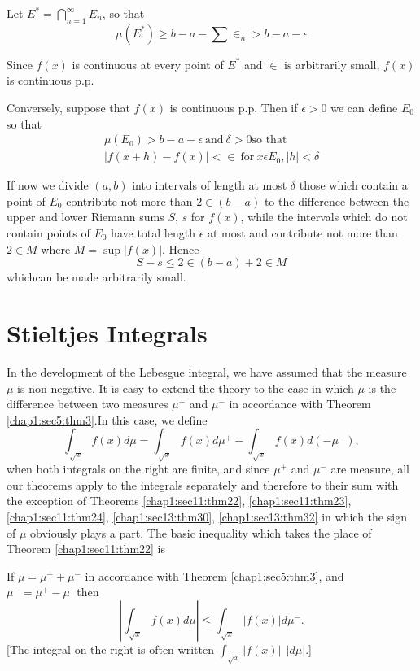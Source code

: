 Let $E^\ast=\bigcap\limits^\infty_{n=1} E_n$, so that
$$
\mu (E^\ast) \geq  b-a-\sum \in _n >  b-a-\epsilon 
$$

Since $f(x)$ is continuous at every point of $E^*$ and $\in $ is
arbitrarily small, $f(x)$ is continuous p.p. 

Conversely, suppose that $f(x)$ is continuous p.p. Then if $\epsilon >
0$ we can define $E_0$ so that 
\begin{gather*}
 \mu (E_0)> b-a-\epsilon ~\text{and}~ \delta >0 \text{so that} \\
 |f(x+h)-f(x)|< \in ~\text{for} ~ x \epsilon E_0, | h|< \delta
\end{gather*}

If now we divide $(a,b)$ into intervals of length at most $\delta$
those which contain a point of $E_0$ contribute not more than $2\in (b-a)$ to 
the difference between the upper and lower Riemann sums $S$, $s$ for
$f(x)$, while the intervals which do not contain points of $E_0$ have
total length $\epsilon$ at most and contribute not more than $2\in M$ where
$M=\sup |f(x)|$. Hence 
$$ 
S-s \leq  2 \in (b-a)+ 2 \in M 
$$
which\pageoriginale can be made arbitrarily small.
 
\section{Stieltjes Integrals}\label{chap1:sec15}

In the development of the Lebesgue integral, we have assumed
that the measure $\mu$ is non-negative. It is easy to extend the theory 
to the case in which $\mu$ is the difference between two measures
$\mu ^+$ and $\mu^-$ in accordance with Theorem
\ref{chap1:sec5:thm3}.In this case, we define 
$$ 
\int_{\sqrt{x}} f(x) d \mu = \int_{\sqrt{x}} f (x)d \mu^+ -
\int_{\sqrt{x}} f(x) d (- \mu^-),
$$ 
when both integrals on the right are finite, and since $\mu^+$  and $\mu^-$
are measure, all our theorems apply to the integrals separately and
therefore to their sum with the exception of Theorems
\ref{chap1:sec11:thm22}, \ref{chap1:sec11:thm23},
\ref{chap1:sec11:thm24}, \ref{chap1:sec13:thm30},  
\ref{chap1:sec13:thm32} in which the sign of $\mu$ obviously plays a part. 
The basic inequality which takes the place of Theorem
\ref{chap1:sec11:thm22} is  

\begin{theorem}\label{chap1:sec15:thm36}
  If $\mu = \mu^+ + \mu^-$ in accordance with Theorem \ref{chap1:sec5:thm3},
  and $\mu^-=\mu^+ -\mu^-$then
  $$
  |\int_{\sqrt{x}}f(x)d\mu |\leq  \int_{\sqrt{x}}|f(x)| d \mu^-.
  $$
  [The integral on the right is often written
    $\int_{\sqrt{x}}|f(x)|~~|d \mu |. $] 
\end{theorem}

